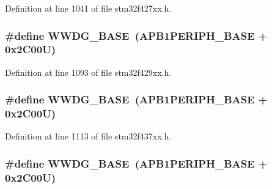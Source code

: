 Definition at line 1041 of file stm32f427xx.\+h.

\subsubsection[{\texorpdfstring{W\+W\+D\+G\+\_\+\+B\+A\+SE}{WWDG_BASE}}]{\setlength{\rightskip}{0pt plus 5cm}\#define W\+W\+D\+G\+\_\+\+B\+A\+SE~({\bf A\+P\+B1\+P\+E\+R\+I\+P\+H\+\_\+\+B\+A\+SE} + 0x2\+C00\+U)}\hypertarget{group___peripheral__memory__map_ga9a5bf4728ab93dea5b569f5b972cbe62}{}\label{group___peripheral__memory__map_ga9a5bf4728ab93dea5b569f5b972cbe62}


Definition at line 1093 of file stm32f429xx.\+h.

\subsubsection[{\texorpdfstring{W\+W\+D\+G\+\_\+\+B\+A\+SE}{WWDG_BASE}}]{\setlength{\rightskip}{0pt plus 5cm}\#define W\+W\+D\+G\+\_\+\+B\+A\+SE~({\bf A\+P\+B1\+P\+E\+R\+I\+P\+H\+\_\+\+B\+A\+SE} + 0x2\+C00\+U)}\hypertarget{group___peripheral__memory__map_ga9a5bf4728ab93dea5b569f5b972cbe62}{}\label{group___peripheral__memory__map_ga9a5bf4728ab93dea5b569f5b972cbe62}


Definition at line 1113 of file stm32f437xx.\+h.

\subsubsection[{\texorpdfstring{W\+W\+D\+G\+\_\+\+B\+A\+SE}{WWDG_BASE}}]{\setlength{\rightskip}{0pt plus 5cm}\#define W\+W\+D\+G\+\_\+\+B\+A\+SE~({\bf A\+P\+B1\+P\+E\+R\+I\+P\+H\+\_\+\+B\+A\+SE} + 0x2\+C00\+U)}\hypertarget{group___peripheral__memory__map_ga9a5bf4728ab93dea5b569f5b972cbe62}{}\label{group___peripheral__memory__map_ga9a5bf4728ab93dea5b569f5b972cbe62}


